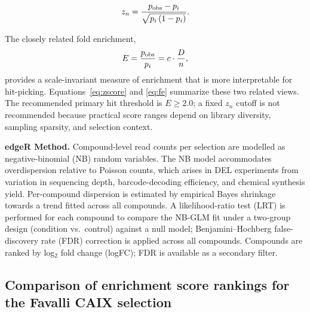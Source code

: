 \begin{equation}
z_n = \frac{p_{\rm obs} - p_i}{\sqrt{p_i\,(1 - p_i)}}.
\label{eq:zscore}
\end{equation}

The closely related fold enrichment,
\begin{equation}
E = \frac{p_{\rm obs}}{p_i} = c \cdot \frac{D}{n},
\label{eq:fe}
\end{equation}
provides a scale-invariant measure of enrichment that is more interpretable for
hit-picking. Equations~\ref{eq:zscore} and \ref{eq:fe} summarize these two
related views. The recommended primary hit threshold is $E \geq 2.0$; a fixed
$z_n$ cutoff is not recommended because practical score ranges depend on
library diversity, sampling sparsity, and selection context.

\textbf{edgeR Method.}
Compound-level read counts per selection are modelled as negative-binomial
(NB) random variables. The NB model accommodates overdispersion relative to
Poisson counts, which arises in DEL experiments from variation in sequencing
depth, barcode-decoding efficiency, and chemical synthesis yield. Per-compound
dispersion is estimated by empirical Bayes shrinkage towards a trend fitted
across all compounds\cite{robinson_edgerbioconductorpackage_2010}. A likelihood-ratio test (LRT) is performed
for each compound to compare the NB-GLM fit under a two-group design
(condition vs.\ control) against a null model; Benjamini--Hochberg
false-discovery rate (FDR) correction is applied across all compounds.
Compounds are ranked by log$_2$ fold change (logFC); FDR is available as a
secondary filter.

\subsection{Comparison of enrichment score rankings for the Favalli CAIX selection}
\label{supp:enrichment-scores-comparison}

